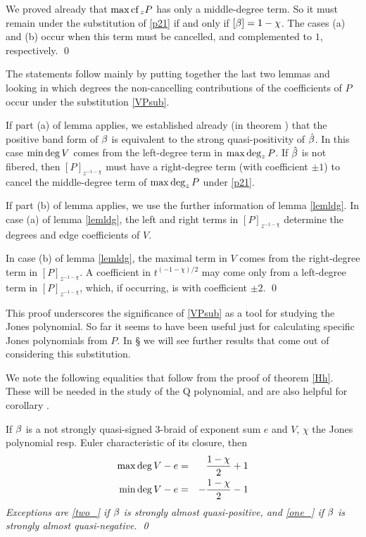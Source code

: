 \proof We proved already that $\max\text{\rm cf}\,_zP$ has only a middle-degree term.
So it must remain under the substitution of \eqref{p21} if and only
if $[\beta]=1-\chi$. The cases (a) and (b) occur when this term must
be cancelled, and complemented to $1$, respectively. \qed

The statements follow mainly by putting together the last two
lemmas and looking in which degrees the
non-cancelling contributions of the coefficients of $P$
occur under the substitution \eqref{VPsub}.

If part (a) of lemma  applies, we established already
(in theorem )
that the positive band form of $\beta$ is equivalent to the strong
quasi-positivity of $\hat{\beta}$. In this case $\min\deg V$ comes from
the left-degree term in $\max\deg_zP$. If $\hat{\beta}$ is not
fibered, then $[P]_{z^{-1-\chi}}$ must have a right-degree
term (with coefficient $\pm 1$) to cancel the middle-degree
term of $\max\deg_zP$ under \eqref{p21}.

If part (b) of lemma  applies, we use the
further information of lemma \ref{lemldg}.
In case (a) of lemma \ref{lemldg}, the left and right
terms in $[P]_{z^{-1-\chi}}$ determine the degrees
and edge coefficients of $V$.

In case (b) of lemma \ref{lemldg},
the maximal term in $V$ comes from the right-degree term in
$[P]_{z^{-1-\chi}}$. A coefficient in $t^{(-1-\chi)/2}$
may come only from a left-degree term in $[P]_{z^{-1-\chi}}$,
which, if occurring, is with coefficient $\pm 2$. \qed

This proof underscores the significance of \eqref{VPsub}
as a tool for studying the Jones polynomial. So far it
seems to have been useful just for calculating specific
Jones polynomials from $P$. In \S{} we will
see further results that come out of considering this
substitution.

We note the following equalities that follow from the proof of
theorem \ref{Hh}. These will be needed in the study of the Q
polynomial, and are also helpful for corollary .

\begin{lemma}\label{lemma_}
If $\beta$ is a not strongly quasi-signed 3-braid of exponent sum $e$
and $V$, $\chi$ the Jones polynomial resp. Euler characteristic
of its closure, then
\begin{eqnarray}
\label{one_}\Md V-e & = & \frac{1-\chi}{2}+1 \\
\label{two_}\md V-e & = & -\frac{1-\chi}{2}-1 
\end{eqnarray}
\em{Exceptions} are \eqref{two_} if $\beta$ is strongly
almost quasi-positive, and \eqref{one_} if $\beta$ is strongly
almost quasi-negative. \qed
\end{lemma}

